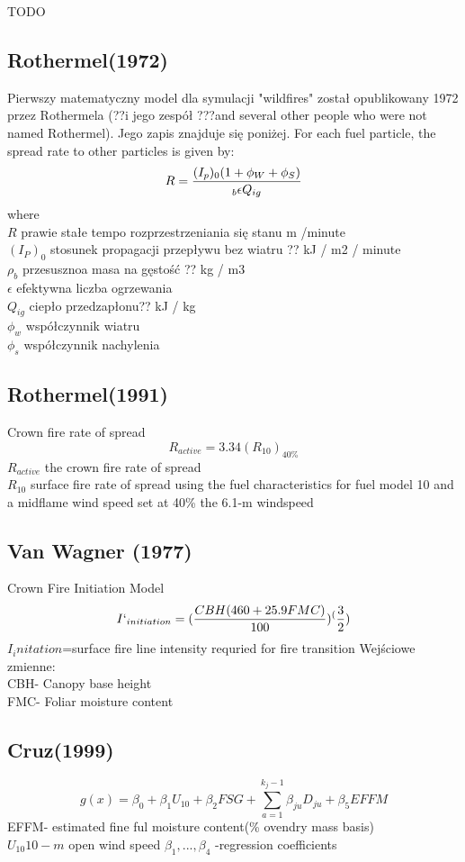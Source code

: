\documentclass[a4paper, 11pt]{article}
\begin{document}
	
	\indent
	TODO\\
	\subsection{Rothermel(1972)}
	\indent
	Pierwszy matematyczny model dla symulacji "wildfires" został opublikowany 1972 przez Rothermela (??i jego zespół ???and several other people who were not named Rothermel). Jego zapis znajduje się poniżej.
	For each fuel particle, the spread rate to other particles is given by: 
$$
R=\frac{(I_p)_0(1+\phi_W +\phi_S)}{_b\epsilon Q_{ig}}\\
$$
where\\
$R$	prawie stałe tempo rozprzestrzeniania się stanu	m /minute\\
$(I_P)_0$	stosunek propagacji przepływu bez wiatru ??	kJ / m2 / minute\\
$\rho_b$	przesusznoa masa na gęstość ??	kg / m3\\
$\epsilon$ efektywna liczba ogrzewania	\\
$Q_{ig}$	ciepło przedzapłonu??	kJ / kg\\
$\phi_w$	współczynnik wiatru	\\
$\phi_s$	współczynnik nachylenia\\

\subsection{Rothermel(1991)}
\indent
Crown fire rate of spread
$$
R_{active}=3.34(R_10)_{40\%}
$$
$R_{active}$ the crown fire rate of spread\\
$R_10$ surface fire rate of spread using the fuel characteristics for fuel model 10 and a midflame wind speed set at 40\% the 6.1-m windspeed\\
\subsection{Van Wagner (1977)}
\indent
Crown Fire Initiation Model
$$
I`_{initiation}=(\frac{CBH(460+25.9FMC)}{100})^(\frac{3}{2})
$$
$I_initation$=surface fire line intensity requried for fire transition
Wejściowe zmienne:\\
CBH- Canopy base height\\
FMC- Foliar moisture content
\subsection{Cruz(1999)}
$$
g(x)=\beta_0+\beta_{1}U_10+\beta_{2}FSG+ \sum\limits_{a=1}^{k_j -1}\beta_{ju}D_{ju}+\beta_5EFFM
$$
EFFM- estimated fine ful moisture content(\% ovendry mass basis)\\
$U_10  10-m$ open wind speed
$\beta_1, ...,\beta_4$ -regression coefficients
\end{document}
